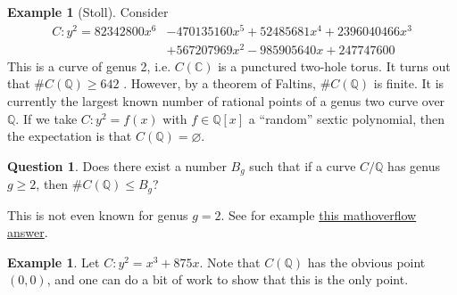 \documentclass{article}
\theoremstyle{definition}
\newtheorem{example}[subsection]{Example}
\newtheorem{question}[subsection]{Question}
\begin{document}
\begin{example}[Stoll]
Consider 
\begin{align*}
  C : y^2 = 82342800 x^6 &- 470135160 x^5 + 52485681 x^4 + 2396040466 x^3 \\
    &+ 567207969 x^2 - 985905640 x + 247747600
\end{align*}
This is a curve of genus 2, i.e. $C(\mathbb{C})$ is a punctured two-hole 
torus. It turns out that $\# C(\mathbb{Q})\geqslant 642$ \cite[\S 6]{st09}. 
However, by a theorem of Faltins, $\# C(\mathbb{Q})$ is finite. It is 
currently the largest known number of rational points of a genus two curve 
over $\mathbb{Q}$. If we take $C:y^2=f(x)$ with $f\in\mathbb{Q}[x]$ a 
``random'' sextic polynomial, then the expectation is that 
$C(\mathbb{Q})=\varnothing$. 
\end{example}

\begin{question}
Does there exist a number $B_g$ such that if a curve $C/\mathbb{Q}$ has 
genus $g\geqslant 2$, then $\# C(\mathbb{Q})\leqslant B_g$?
\end{question}

This is not even known for genus $g=2$. See for example \href{http://mathoverflow.net/questions/103327/what-is-the-maximum-number-of-rational-points-of-a-curve-of-genus-2-over-the-rat}{this mathoverflow answer}. 

\begin{example}
Let $C:y^2=x^3+875 x$. Note that $C(\mathbb{Q})$ has the obvious point 
$(0,0)$, and one can do a bit of work to show that this is the only point. 
\end{example}
\end{document}
